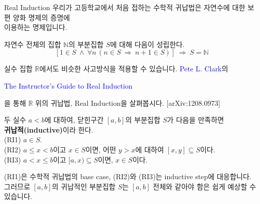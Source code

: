 \documentclass[serif]{beamer}
\begin{document}
\begin{frame}{Real Induction}
    우리가 고등학교에서 처음 접하는 수학적 귀납법은 자연수에 대한 보편 양화 명제의 증명에 \\
    이용하는 명제입니다.
    \begin{hint}
        자연수 전체의 집합 $\mathbb N$의 부분집합 $S$에 대해 다음이 성립한다.
        \[
            [1\in S~\wedge~\forall n\, (n\in S~\Longrightarrow~n+1\in S)]~\Longrightarrow~S=\mathbb N
        \]
    \end{hint}
    실수 집합 $\mathbb R$에서도 비슷한 사고방식을 적용할 수 있습니다. \textcolor{blue}{Pete L. Clark}의
    \begin{center}
        \textcolor{blue}{The Instructor's Guide to Real Induction}
    \end{center}
    을 통해 $\mathbb R$ 위의 귀납법, Real Induction을 살펴봅시다. [arXiv:1208.0973]
    \begin{dfn*}{}
        두 실수 $a<b$에 대하여, 닫힌구간 $[a,b]$의 부분집합 $S$가 다음을 만족하면 \\
        \textbf{귀납적(inductive)}이라 한다.\\[3pt]
        (RI1) $a\in S$. \\
        (RI2) $a\leq x<b$이고 $x\in S$이면, 어떤 $y>x$에 대하여 $[x,y]\subseteq S$이다. \\
        (RI3) $a<x\leq b$이고 $[a,x)\subseteq S$이면, $x\in S$이다.
    \end{dfn*}
    (RI1)은 수학적 귀납법의 base case, (RI2)와 (RI3)는 inductive step에 대응합니다. \\
    그러므로 $[a,b]$의 귀납적인 부분집합 $S$는 $[a,b]$ 전체와 같아야 함은 쉽게 예상할 수 있습니다.
\end{frame}
\end{document}
